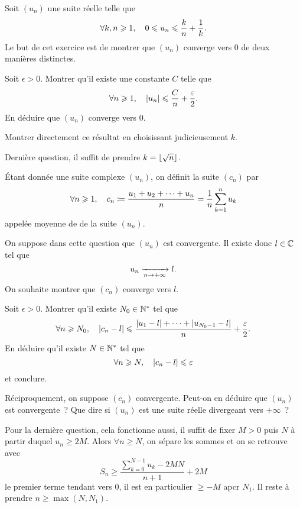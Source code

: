 \documentclass{magnolia}
\begin{document}
Soit $(u_n)$ une suite réelle telle que
\[\forall k,n \geqslant 1 ,\quad 0\leqslant u_n \leqslant  \frac{k}{n}+\frac{1}{k}.\]
Le but de cet exercice est de montrer que $(u_n)$ converge vers $0$ de deux
manières distinctes.
\begin{questions}
\question
  \begin{questions}
  \question Soit $\epsilon > 0$. Montrer qu'il existe une constante $C$
    telle que
    $$\forall n \geqslant 1 ,\quad |u_n|\leqslant \frac{C}{n} + \frac{\varepsilon}{2}.$$
  \question En déduire que $(u_n)$ converge vers $0$.
  \end{questions}
\question Montrer directement ce résultat en choisissant judicieusement $k$.
\end{questions}
\begin{sol}
Dernière question, il suffit de prendre $k=\left\lfloor\sqrt{n}\right\rfloor$.
\end{sol}

Étant donnée une suite complexe $(u_n)$, on définit la suite $(c_n)$ par
\[\forall n \geqslant 1 ,\quad c_n\coloneqq\frac{u_1+u_2+\dots+u_n}{n}=\frac{1}{n}
  \sum_{k=1}^{n} u_k\]
appelée moyenne de  de la suite $(u_n)$. 
\begin{questions}
\question On suppose dans cette question que $(u_n)$ est convergente. Il existe donc
  $l\in\mathbb{C}$ tel que
  \[u_n\xrightarrow[n\rightarrow +\infty]{}l.\]
  On souhaite montrer que $(c_n)$ converge vers $l$.
  \begin{questions}
  \question Soit $\epsilon>0$. Montrer qu'il existe $N_0\in{\mathbb{N}^*}$ tel que
    \[\forall n \geqslant N_0 ,\quad \left|c_n-l\right|\leqslant \frac{\left|u_1-l\right|+\dots+\left|u_{N_0-1}-l\right|}{n} +
      \frac{\varepsilon}{2}.\]
  \question En déduire qu'il existe $N\in{\mathbb{N}^*}$ tel que
    \[\forall n \geqslant N ,\quad |c_n-l|\leqslant \varepsilon\]
    et conclure.
  \end{questions}
\question Réciproquement, on suppose $(c_n)$ convergente. Peut-on en déduire que
  $(u_n)$ est convergente~?
\question Que dire si $(u_n)$ est une suite réelle divergeant vers $+\infty$~?
\end{questions}
\begin{sol}
Pour la dernière question, cela fonctionne aussi, il suffit de fixer $M>0$ puis $N$ à partir duquel $u_n\geq 2M$. Alors $\forall n\geq N$, on sépare les sommes et on se retrouve avec $$S_n \geq \frac{\sum_{k=0}^{N-1}u_k-2MN}{n+1}+2M$$ le premier terme tendant vers $0$, il est en particulier $\geq -M$ apcr $N_1$. Il reste à prendre $n\geq \max(N,N_1)$.
\end{sol}
\end{document}
